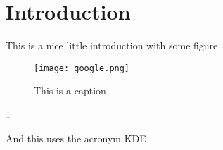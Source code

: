 
\chapter{Introduction}
\label{ch:Introduction}

This is a nice little introduction with some figure
\begin{figure}[htp]
\begin{center}
  \texttt{[image: google.png]}
\caption{This is a caption}
\end{center}
\end{figure} 

\cite{becker2008a}
\dots

And this uses the acronym \ac{KDE}

